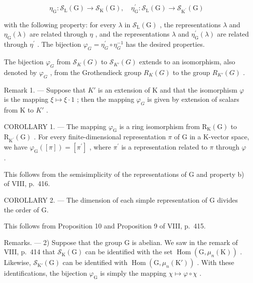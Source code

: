 \[
\eta_ {\mathrm{G}}: \mathcal {S} _ {\mathrm{L}} (\mathrm{G}) \to \mathcal {S} _ {\mathrm{K}} (\mathrm{G}), \quad \eta_ {\mathrm{G}} ^ {\prime}: \mathcal {S} _ {\mathrm{L}} (\mathrm{G}) \to \mathcal {S} _ {\mathrm {K^ {\prime}}} (\mathrm{G})
\]

with the following property: for every \(\lambda\) in \(\mathcal{S}_{\mathrm{L}}(\mathrm{G})\) , the representations \(\lambda\) and \(\eta_{\mathrm{G}}(\lambda)\) are related through \(\eta\) , and the representations \(\lambda\) and \(\eta_{\mathrm{G}}^{\prime}(\lambda)\) are related through \(\eta^{\prime}\) . The bijection \(\varphi_{G} = \eta_{G}^{\prime} \circ \eta_{G}^{-1}\) has the desired properties.

The bijection \(\varphi_{G}\) from \(\mathcal{S}_{K}(G)\) to \(\mathcal{S}_{K'}(G)\) extends to an isomorphism, also denoted by \(\varphi_{G}\) , from the Grothendieck group \(R_{K}(G)\) to the group \(R_{K'}(G)\) .

Remark 1. --- Suppose that \(K'\) is an extension of K and that the isomorphism \(\varphi\) is the mapping \(\xi \mapsto \xi \cdot 1\) ; then the mapping \(\varphi_{G}\) is given by extension of scalars from K to \(K'\) .

COROLLARY 1. --- The mapping \(\varphi_{\mathrm{G}}\) is a ring isomorphism from \(\mathrm{R}_{\mathrm{K}}(\mathrm{G})\) to \(\mathrm{R}_{\mathrm{K}^{\prime}}(\mathrm{G})\) . For every finite-dimensional representation \(\pi\) of \(\mathrm{G}\) in a K-vector space, we have \(\varphi_{\mathrm{G}}([\pi]) = [\pi^{\prime}]\) , where \(\pi^{\prime}\) is a representation related to \(\pi\) through \(\varphi\) .

This follows from the semisimplicity of the representations of G and property b) of VIII, p.~416.

COROLLARY 2. --- The dimension of each simple representation of G divides the order of G.

This follows from Proposition 10 and Proposition 9 of VIII, p.~415.

Remarks. --- 2) Suppose that the group G is abelian. We saw in the remark of VIII, p.~414 that \(\mathcal{S}_{\mathrm{K}}(\mathrm{G})\) can be identified with the set \(\operatorname{Hom}(\mathrm{G}, \mu_n(\mathrm{K}))\) . Likewise, \(\mathcal{S}_{\mathrm{K}'}(\mathrm{G})\) can be identified with \(\operatorname{Hom}(\mathrm{G}, \mu_n(\mathrm{K}'))\) . With these identifications, the bijection \(\varphi_{\mathrm{G}}\) is simply the mapping \(\chi \mapsto \varphi \circ \chi\) .

